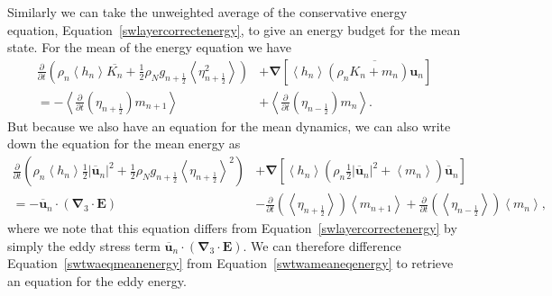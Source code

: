 \documentclass[12pt,a4paper]{report}
\newcommand*\thkmean[1]{\overline{#1}}
\newcommand*\nthkmean[1]{\left\langle{#1}\right\rangle}
\newcommand*\equref[1]{Equation~\eqref{#1}}
\newcommand*{\half}{\frac{1}{2}}
\begin{document}
    Similarly we can take the unweighted average of the
    conservative energy equation, \equref{swlayercorrectenergy}, to give an energy
    budget for the mean state. For the mean of the
    energy equation we have
    \begin{equation}
    \begin{split}
        \frac{\partial}{\partial t}\left(\rho_{n} \nthkmean{h_{n}} \thkmean{K_{n}}+ 
        \half \rho_{N} g_{n+\half }\nthkmean{\eta_{n+\half }^{2}} \right)
        &+\boldsymbol{\nabla} \left[\nthkmean{h_{n}} \thkmean{\left(\rho_{n}K_{n}+m_{n}\right) \boldsymbol{u}_{n}}\right] \\
        =- \nthkmean{\frac{\partial}{\partial t}\left(\eta_{n+\half }\right)   m_{n+1}}
        &+ \nthkmean{\frac{\partial}{\partial t}\left(\eta_{n-\half }\right) m_{n}}.
      \end{split}
                    \label{swtwameaneqenergy}
    \end{equation}
    But because we also have an equation for the mean dynamics, we
    can also write down the equation for the mean energy as
    \begin{equation}
        \begin{split}
        \frac{\partial}{\partial t}\left(\rho_{n} \nthkmean{h_{n}} \half \left|\thkmean{\boldsymbol{u}}_{n}\right|^{2}+ 
        \half \rho_{N} g_{n+\half }\nthkmean{\eta_{n+\half }}^{2} \right) &+\boldsymbol{\nabla} \left[\nthkmean{h_{n}} \left(\rho_{n}\half \left|\thkmean{\boldsymbol{u}}_{n}\right|^{2}+\nthkmean{m_{n}}\right) \thkmean{\boldsymbol{u}}_{n}\right] \\
        =-\thkmean{\boldsymbol{u}}_{n} \cdot \left(\boldsymbol{\nabla}_{3}\cdot \boldsymbol{E}\right)&- \frac{\partial}{\partial t}\left(\nthkmean{\eta_{n+\half }}\right)   \nthkmean{m_{n+1}}
        + \frac{\partial}{\partial t}\left(\nthkmean{\eta_{n-\half }}\right) \nthkmean{m_{n}},
              \end{split}
              \label{swtwaeqmeanenergy}
    \end{equation}
    where we note that this equation differs from \equref{swlayercorrectenergy} by simply the eddy stress
    term $\thkmean{\boldsymbol{u}}_{n} \cdot \left(\boldsymbol{\nabla}_{3}\cdot \boldsymbol{E}\right)$.
    We can therefore difference \equref{swtwaeqmeanenergy} from
    \equref{swtwameaneqenergy} to retrieve an equation
    for the eddy energy.
\end{document}

